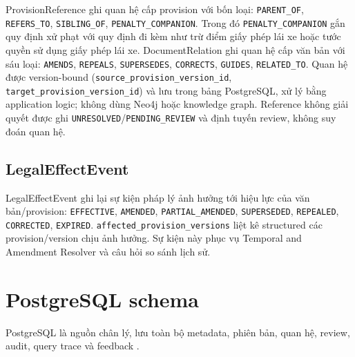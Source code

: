 \documentclass[a4paper,12pt]{extreport}
\newcommand{\code}[1]{\texttt{#1}}
\begin{document}
\begin{sloppypar}
ProvisionReference ghi quan hệ cấp provision với bốn loại: \code{PARENT\_OF}, \code{REFERS\_TO}, \code{SIBLING\_OF}, \code{PENALTY\_COMPANION}. Trong đó \code{PENALTY\_COMPANION} gắn quy định xử phạt với quy định đi kèm như trừ điểm giấy phép lái xe hoặc tước quyền sử dụng giấy phép lái xe. DocumentRelation ghi quan hệ cấp văn bản với sáu loại: \code{AMENDS}, \code{REPEALS}, \code{SUPERSEDES}, \code{CORRECTS}, \code{GUIDES}, \code{RELATED\_TO}. Quan hệ được version-bound (\code{source\_provision\_version\_id}, \code{target\_provision\_version\_id}) và lưu trong bảng PostgreSQL, xử lý bằng application logic; không dùng Neo4j hoặc knowledge graph. Reference không giải quyết được ghi \code{UNRESOLVED}/\code{PENDING\_REVIEW} và định tuyến review, không suy đoán quan hệ.
\end{sloppypar}

\subsection{LegalEffectEvent}

\begin{sloppypar}
LegalEffectEvent ghi lại sự kiện pháp lý ảnh hưởng tới hiệu lực của văn bản/provision: \code{EFFECTIVE}, \code{AMENDED}, \code{PARTIAL\_AMENDED}, \code{SUPERSEDED}, \code{REPEALED}, \code{CORRECTED}, \code{EXPIRED}. \code{affected\_provision\_versions} liệt kê structured các provision/version chịu ảnh hưởng. Sự kiện này phục vụ Temporal and Amendment Resolver và câu hỏi so sánh lịch sử.
\end{sloppypar}

\section{PostgreSQL schema}

PostgreSQL là nguồn chân lý, lưu toàn bộ metadata, phiên bản, quan hệ, review, audit, query trace và feedback \cite{postgresql2026}.
\end{document}
